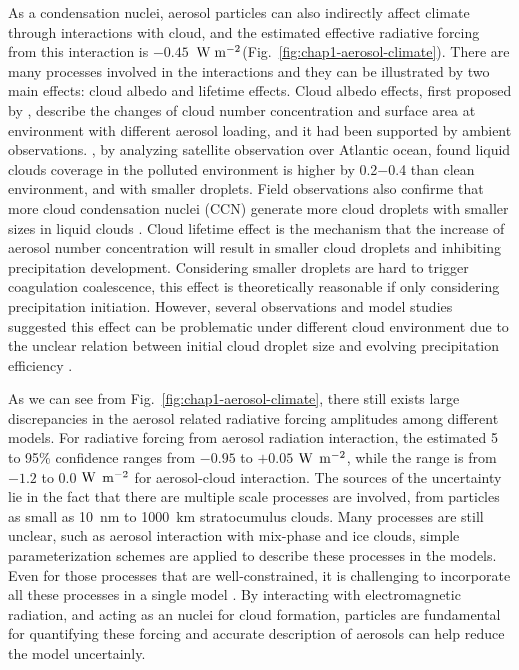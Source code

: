 \documentclass[edeposit,fullpage]{uiucthesis2009}
\makeatletter
\DeclareRobustCommand*\unit[1]
 {\ensuremath{%
   {\thinmuskip3mu\relax
    \def\mu{\text{\textmu}}\def~{\,}%
    \ifx\f@series\testbx\mathbf{#1}\else\mathrm{#1}\fi}}}
\makeatother
\begin{document}
As a condensation nuclei, aerosol particles can also indirectly affect climate through interactions with cloud, and the estimated effective radiative forcing from this interaction is $-0.45$~\unit{W\;m^{-2}}(Fig.~\ref{fig:chap1-aerosol-climate}). There are many processes involved in the interactions and they can be illustrated by two main effects: cloud albedo and lifetime effects. Cloud albedo effects, first proposed by \citet{twomey1977influence}, describe the changes of cloud number concentration and surface area at environment with different aerosol loading, and it had been supported by ambient observations. \citet{kaufman2005effect}, by analyzing satellite observation over Atlantic ocean, found liquid clouds coverage in the polluted environment is higher by 0.2$-$0.4 than clean environment, and with smaller droplets. Field observations also confirme that more cloud condensation nuclei (CCN) generate more cloud droplets with smaller sizes in liquid clouds \citep{jia2019distinct,kleinman2012aerosol}. Cloud lifetime effect is the mechanism that the increase of aerosol number concentration will result in smaller cloud droplets and inhibiting precipitation development. Considering smaller droplets are hard to trigger coagulation coalescence, this effect is theoretically reasonable if only considering precipitation initiation. However, several observations and model studies suggested this effect can be problematic under different cloud environment due to the unclear relation between initial cloud droplet size and evolving precipitation efficiency \citep{stevens2009untangling}. 

As we can see from Fig.~\ref{fig:chap1-aerosol-climate}, there still exists large discrepancies in the aerosol related radiative forcing amplitudes among different models. For radiative forcing from aerosol radiation interaction, the estimated 5 to 95\% confidence ranges from $- 0.95$ to $+ 0.05$ $\rm W$ $\rm m^{-2}$, while the range is from $-1.2$ to $0.0$ $\rm W$ $\rm m^{-2}$ for aerosol-cloud interaction. The sources of the uncertainty lie in the fact that there are multiple scale processes are involved, from particles as small as 10~nm to 1000~km stratocumulus clouds. Many processes are still unclear, such as aerosol interaction with mix-phase and ice clouds, simple parameterization schemes are applied to describe these processes in the models. Even for those processes that are well-constrained, it is challenging to incorporate all these processes in a single model \citep{seinfeld2016improving,bellouin2020bounding}. By interacting with electromagnetic radiation, and acting as an nuclei for cloud formation, particles are fundamental for quantifying these forcing and accurate description of aerosols can help reduce the model uncertainly. 
\end{document}
